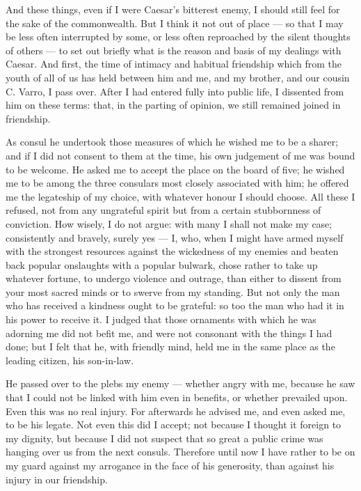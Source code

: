  And these things, even if I were Caesar's bitterest enemy, I should still feel for the sake of the commonwealth. But I think it not out of place --- so that I may be less often interrupted by some, or less often reproached by the silent thoughts of others --- to set out briefly what is the reason and basis of my dealings with Caesar. And first, the time of intimacy and habitual friendship which from the youth of all of us has held between him and me, and my brother, and our cousin C. Varro, I pass over. After I had entered fully into public life, I dissented from him on these terms: that, in the parting of opinion, we still remained joined in friendship.

 As consul he undertook those measures of which he wished me to be a sharer; and if I did not consent to them at the time, his own judgement of me was bound to be welcome. He asked me to accept the place on the board of five; he wished me to be among the three consulars most closely associated with him; he offered me the legateship of my choice, with whatever honour I should choose. All these I refused, not from any ungrateful spirit but from a certain stubbornness of conviction. How wisely, I do not argue: with many I shall not make my case; consistently and bravely, surely yes --- I, who, when I might have armed myself with the strongest resources against the wickedness of my enemies and beaten back popular onslaughts with a popular bulwark, chose rather to take up whatever fortune, to undergo violence and outrage, than either to dissent from your most sacred minds or to swerve from my standing. But not only the man who has received a kindness ought to be grateful: so too the man who had it in his power to receive it. I judged that those ornaments with which he was adorning me did not befit me, and were not consonant with the things I had done; but I felt that he, with friendly mind, held me in the same place as the leading citizen, his son-in-law.

 He passed over to the plebs my enemy --- whether angry with me, because he saw that I could not be linked with him even in benefits, or whether prevailed upon. Even this was no real injury. For afterwards he advised me, and even asked me, to be his legate. Not even this did I accept; not because I thought it foreign to my dignity, but because I did not suspect that so great a public crime was hanging over us from the next consuls. Therefore until now I have rather to be on my guard against my arrogance in the face of his generosity, than against his injury in our friendship.

